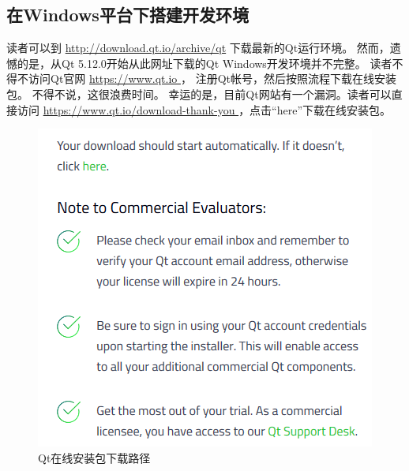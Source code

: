 ﻿%




%


\subsection{
在Windows平台下搭建开发环境
}\label{s000110}


读者可以到 \url{http://download.qt.io/archive/qt}
下载最新的Qt运行环境。
然而，遗憾的是，从Qt 5.12.0开始从此网址下载的Qt Windows开发环境并不完整。
读者不得不访问Qt官网 \url{https://www.qt.io
}，
注册Qt帐号，然后按照流程下载在线安装包。
不得不说，这很浪费时间。
幸运的是，目前Qt网站有一个漏洞。读者可以直接访问
 \url{https://www.qt.io/download-thank-you
}，点击“here”下载在线安装包。

\begin{figure}[ht] %
\centering        %
\includegraphics{chapter01/windows_download_here.png}%
\caption{Qt在线安装包下载路径}%
\label{p000000}%
\end{figure}
















